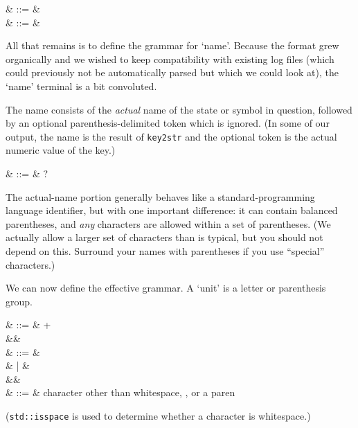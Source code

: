 \begin{grammar}
   & ::= &  \term{(}\cfgsp  {}\cfgsp \term{,}\cfgsp  {}\cfgsp  \term{,}\cfgsp  {}\cfgsp  \term{)} \\
   & ::= &  \term{(}\cfgsp  {}\cfgsp \term{,}\cfgsp  {}\cfgsp  \term{,}\cfgsp  {}\cfgsp  \term{,}\cfgsp  {}\cfgsp  \term{)}
\end{grammar}


All that remains is to define the grammar for `name'. Because the
format grew organically and we wished to keep compatibility with
existing log files (which could previously not be automatically parsed
but which we could look at), the `name' terminal is a bit convoluted.

The name consists of the \textsl{actual} name of the state or symbol
in question, followed by an optional parenthesis-delimited token which
is ignored. (In some of our output, the name is the result of
\texttt{key2str} and the optional token is the actual numeric value of
the key.)

\begin{grammar}
   & ::= &  \cfgsp  {}?
\end{grammar}

The actual-name portion generally behaves like a standard-programming
language identifier, but with one important difference: it can contain
balanced parentheses, and \textsl{any} characters are allowed within a
set of parentheses. (We actually allow a larger set of characters than
is typical, but you should not depend on this. Surround your names
with parentheses if you use ``special'' characters.)

We can now define the effective grammar. A `unit' is a letter or
parenthesis group.

\begin{grammar}
   & ::= &  + \\
&& \\
   & ::= &   \\
                 &   | &   \\
&& \\
  & ::= &  \textrm{character other than whitespace, \term{,}, or a paren}
\end{grammar}

(\texttt{std::isspace} is used to determine whether a character is
  whitespace.)

